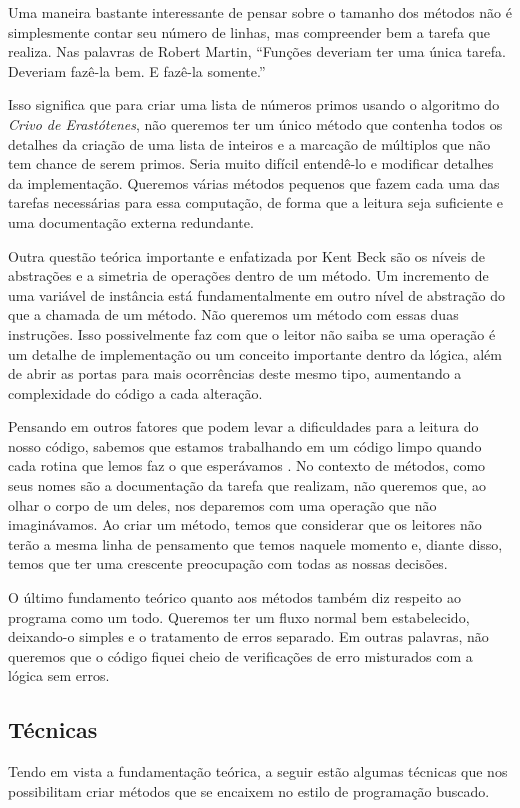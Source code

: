 Uma maneira bastante interessante de pensar sobre o tamanho dos métodos não é simplesmente contar seu número de linhas, mas compreender bem a tarefa que realiza. Nas palavras de Robert Martin, “Funções deveriam ter uma única tarefa. Deveriam fazê-la bem. E fazê-la somente.”
	
Isso significa que para criar uma lista de números primos usando o algoritmo do \textit{Crivo de Erastótenes}, não queremos ter um único método que contenha todos os detalhes da criação de uma lista de inteiros e a marcação de múltiplos que não tem chance de serem primos. Seria muito difícil entendê-lo e modificar detalhes da implementação. Queremos várias métodos pequenos que fazem cada uma das tarefas necessárias para essa computação, de forma que a leitura seja suficiente e uma documentação externa redundante.
	
Outra questão teórica importante e enfatizada por Kent Beck são os níveis de abstrações e a simetria de operações dentro de um método. Um incremento de uma variável de instância está fundamentalmente em outro nível de abstração do que a chamada de um método. Não queremos um método com essas duas instruções. Isso possivelmente faz com que o leitor não saiba se uma operação é um detalhe de implementação ou um conceito importante dentro da lógica, além de abrir as portas para mais ocorrências deste mesmo tipo, aumentando a complexidade do código a cada alteração.
	
Pensando em outros fatores que podem levar a dificuldades para a leitura do nosso código, sabemos que estamos trabalhando em um código limpo quando cada rotina que lemos faz o que esperávamos \citep{Martin2008}. No contexto de métodos, como seus nomes são a documentação da tarefa que realizam, não queremos que, ao olhar o corpo de um deles, nos deparemos com uma operação que não imaginávamos. Ao criar um método, temos que considerar que os leitores não terão a mesma linha de pensamento que temos naquele momento e, diante disso, temos que ter uma crescente preocupação com todas as nossas decisões.
	
O último fundamento teórico quanto aos métodos também diz respeito ao programa como um todo. Queremos ter um fluxo normal bem estabelecido, deixando-o simples e o tratamento de erros separado. Em outras palavras, não queremos que o código fiquei cheio de verificações de erro misturados com a lógica sem erros.
	
\subsection{Técnicas}
Tendo em vista a fundamentação teórica, a seguir estão algumas técnicas que nos possibilitam criar métodos que se encaixem no estilo de programação buscado.

